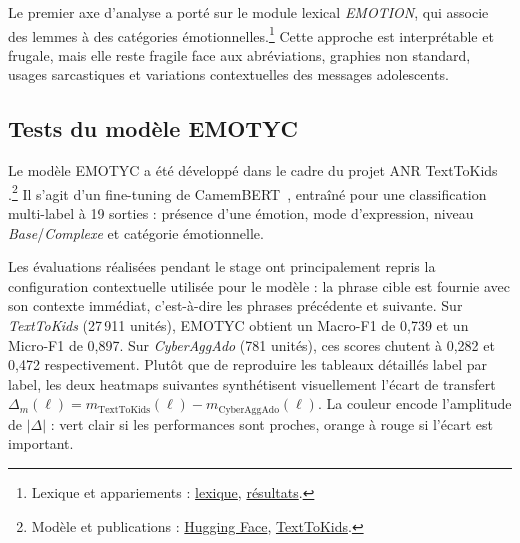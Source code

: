 Le premier axe d'analyse a porté sur le module lexical \textit{EMOTION}, qui associe des lemmes à des catégories émotionnelles.\footnote{Lexique et appariements : \href{https://github.com/GwenTsang/ExpressionEmotionnelle/blob/main/emotions/lexique_emotionnel.tsv}{lexique}, \href{https://github.com/GwenTsang/ExpressionEmotionnelle/tree/main/results/simplesitemo_lexicon_matching}{résultats}.} Cette approche est interprétable et frugale, mais elle reste fragile face aux abréviations, graphies non standard, usages sarcastiques et variations contextuelles des messages adolescents.

\subsection{Tests du modèle EMOTYC}

Le modèle EMOTYC a été développé dans le cadre du projet ANR TextToKids \citep{etienne2023analyse,etienne2024emotionidentificationfrenchwritten}.\footnote{Modèle et publications : \href{https://huggingface.co/TextToKids/CamemBERT-base-EmoTextToKids}{Hugging Face}, \href{https://texttokids.irisa.fr/publications/}{TextToKids}.} Il s'agit d'un fine-tuning de CamemBERT~\citep{Martin_2020}, entraîné pour une classification multi-label à 19 sorties : présence d'une émotion, mode d'expression, niveau \textit{Base}/\textit{Complexe} et catégorie émotionnelle.

Les évaluations réalisées pendant le stage ont principalement repris la configuration contextuelle utilisée pour le modèle : la phrase cible est fournie avec son contexte immédiat, c'est-à-dire les phrases précédente et suivante. Sur \textit{TextToKids} (27\,911 unités), EMOTYC obtient un Macro-F1 de 0,739 et un Micro-F1 de 0,897. Sur \textit{CyberAggAdo} (781 unités), ces scores chutent à 0,282 et 0,472 respectivement. Plutôt que de reproduire les tableaux détaillés label par label, les deux heatmaps suivantes synthétisent visuellement l'écart de transfert $\Delta_m(\ell) = m_{\text{TextToKids}}(\ell) - m_{\text{CyberAggAdo}}(\ell)$. La couleur encode l'amplitude de $|\Delta|$ : vert clair si les performances sont proches, orange à rouge si l'écart est important.

